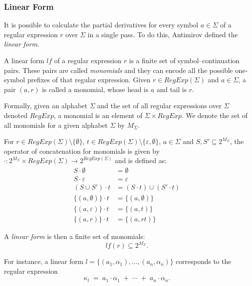 \subsubsection{Linear Form}
\label{chap:prelim:linear_form}
It is possible to calculate the partial derivatives for every symbol $a \in \Sigma$ of a regular expression $r$ over $\Sigma$ in a single pass. To do this, Antimirov \cite{pdregex_antimirov} defined the \emph{linear form}.

A linear form $lf$ of a regular expression $r$ is a finite set of symbol–continuation pairs.  
These pairs are called \textit{monomials} and they can encode all the possible one-symbol prefixes of that regular expression. Given $r \in RegExp(\Sigma)$ and $a \in \Sigma$, a pair $(a, r)$ is called a monomial, whose head is $a$ and tail is $r$.

Formally, given an alphabet $\Sigma$ and the set of all regular expressions over $\Sigma$ denoted $RegExp$, a monomial is an element of $\Sigma \times RegExp$.
We denote the set of all monomials for a given alphabet $\Sigma$ by $M_\Sigma$.

For $r \in RegExp(\Sigma) \setminus \{\emptyset\}$, $t \in RegExp(\Sigma) \setminus \{\varepsilon, \emptyset\}$, $a \in \Sigma$ and $S, S' \subseteq 2^{M_\Sigma}$, the operator of concatenation for monomials is given by $\cdot : 2^{M_\Sigma} \times RegExp(\Sigma) \rightarrow 2^{RegExp(\Sigma)}$ and is defined as:
\begin{align*}
	S \cdot \emptyset &= \emptyset \\
	S \cdot \varepsilon &= \varepsilon \\
	(S \cup S') \cdot t &= (S \cdot t) \cup (S' \cdot t)  \\
	\{(a, \emptyset)\} \cdot t &= \{(a, \emptyset)\} \\
	\{(a, \varepsilon)\} \cdot t &= \{(a, t)\} \\
	\{(a, r)\} \cdot t &= \{(a,rt)\}
\end{align*}

A \emph{linear form} is then a finite set of monomials:
\[
lf(r) \subseteq {2}^{M_\Sigma}.
\]

For instance, a linear form $l = \{(a_1,\alpha_1), \ldots, (a_n,\alpha_n)\}$ corresponds to the regular expression
\[
\kappa_l \;=\; a_1\cdot\alpha_1 \;+\; \cdots \;+\; a_n\cdot\alpha_n.
\]

